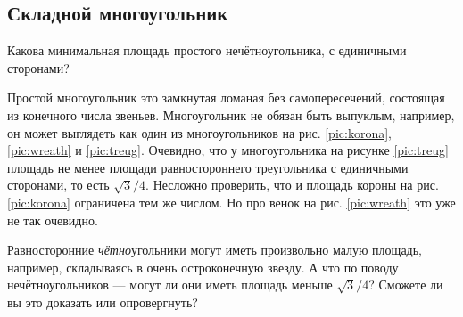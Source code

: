 \subsection*{Складной многоугольник}\label{Сложенный многоугольник}

Какова минимальная площадь простого нечётноугольника, с единичными сторонами?

Простой многоугольник это замкнутая ломаная без самопересечений, состоящая из конечного числа звеньев.
Многоугольник не обязан быть выпуклым,
например, он может выглядеть как один из многоугольников на рис. \ref{pic:korona},
\ref{pic:wreath} и \ref{pic:treug}.
Очевидно, что у многоугольника на рисунке \ref{pic:treug} площадь не менее площади равностороннего треугольника с единичными сторонами, то есть $\sqrt{3}/4$.
Несложно проверить, что и площадь короны на рис. \ref{pic:korona} ограничена тем же числом.
Но про венок на рис. \ref{pic:wreath} это уже не так очевидно.

Равносторонние \emph{чётно}угольники могут иметь произвольно малую площадь, например, складываясь в очень остроконечную звезду.
А что по поводу нечётноугольников --- могут ли они иметь площадь меньше $\sqrt{3}/4$?
Сможете ли вы это доказать или опровергнуть?


